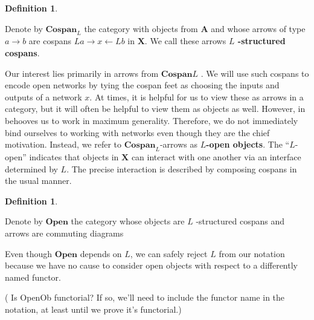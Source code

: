 \documentclass{amsart}
\newcommand{\A}{\cat{A}}
\newcommand{\X}{\cat{X}}
\newcommand{\defn}[1]{\textbf{#1}}
\newcommand{\cat}[1]{\mathbf{#1}}
\newcommand{\diagram}[1]{\raisebox{-0.5\height}{\texttt{[image: \#1]}}}
\newcommand{\Cospan}{\mathbf{Cospan}}
\newcommand{\OpenOb}{\mathbf{Open} }
\newcommand{\edit}[1]{\textcolor{editcolour}{(#1)}}
\newenvironment{exposition}[1]{}{}
\theoremstyle{remark}
\theoremstyle{definition}
\newtheorem{definition}[theorem]{Definition}
\begin{document}
\begin{definition}
  \label{df:struct-cospan}

  Denote by \( \Cospan_L \) the category with objects from \( \A \)
  and whose arrows of type \( a \to b \) are cospans
  \( La \to x \gets Lb \) in \( \X \). We call these arrows \defn{
    \( L \) -structured cospans}.
  
\end{definition}


\begin{exposition}{}

  Our interest lies primarily in arrows from \( \Cospan L \) .  We
  will use such cospans to encode open networks by tying the cospan
  feet as choosing the inputs and outputs of a network $ x $. At
  times, it is helpful for us to view these as arrows in a category,
  but it will often be helpful to view them as objects as well.
  However, in behooves us to work in maximum generality. Therefore, we
  do not immediately bind ourselves to working with networks even
  though they are the chief motivation.  Instead, we refer to
  $ \Cospan_L $-arrows as \defn{$ L $-open objects}.
  The ``\( L \)-open'' indicates that objects in $ \X $ can
  interact with one another via an interface determined by
  $ L $.  The precise interaction is described by composing
  cospans in the usual manner.

\end{exposition}

\begin{definition}
  \label{df:open-objects}
  
  Denote by $ \OpenOb $ the category whose objects are \( L \)
  -structured cospans and arrows are commuting diagrams
  
  Even though \( \OpenOb \) depends on \( L \), we can safely reject
  \( L \) from our notation because we have no cause to consider open
  objects with respect to a differently named functor.

  \edit{ Is OpenOb functorial? If so, we'll need to include the
    functor name in the notation, at least until we prove it's functorial.}

        
\end{definition}
\end{document}

